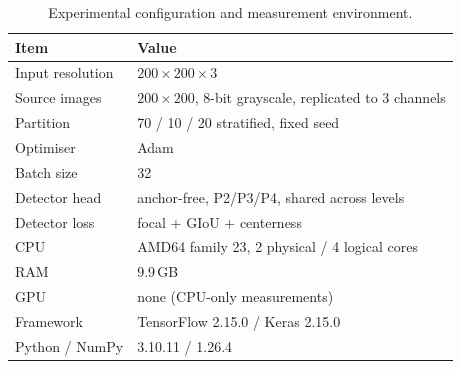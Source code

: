 \begin{table}[t]
\centering
\caption{Experimental configuration and measurement environment.}
\label{tab:setup}
\renewcommand{\arraystretch}{1.15}
\begin{tabular}{ll}
\toprule
\textbf{Item} & \textbf{Value} \\
\midrule
Input resolution & $200\times200\times3$ \\
Source images & $200\times200$, 8-bit grayscale, replicated to 3 channels \\
Partition & 70 / 10 / 20 stratified, fixed seed \\
Optimiser & Adam \\
Batch size & 32 \\
Detector head & anchor-free, P2/P3/P4, shared across levels \\
Detector loss & focal + GIoU + centerness \\
\midrule
CPU & AMD64 family 23, 2 physical / 4 logical cores \\
RAM & 9.9\,GB \\
GPU & none (CPU-only measurements) \\
Framework & TensorFlow 2.15.0 / Keras 2.15.0 \\
Python / NumPy & 3.10.11 / 1.26.4 \\
\bottomrule
\end{tabular}
\end{table}


